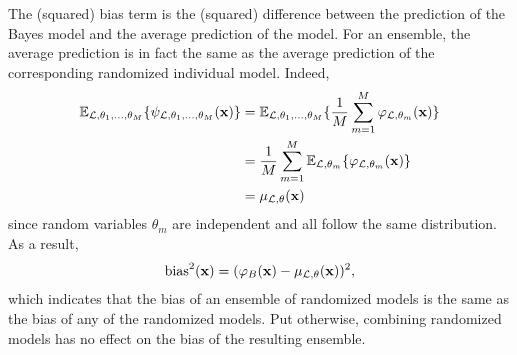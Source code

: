 The (squared) bias term is the (squared) difference between the prediction of the Bayes model
and the average prediction of the model. For an ensemble, the average prediction
is in fact the same as the average prediction of the corresponding randomized individual model. Indeed,
\begin{align}
\mathbb{E}_{{\cal L},\theta_1,\dots,\theta_M} \{ \psi_{{\cal L},\theta_1,\dots,\theta_M}(\mathbf{x}) \} &= \mathbb{E}_{{\cal L},\theta_1,\dots,\theta_M} \{ \frac{1}{M} \sum_{m=1}^M \varphi_{{\cal L},\theta_m}(\mathbf{x}) \} \nonumber \\
&= \frac{1}{M} \sum_{m=1}^M \mathbb{E}_{{\cal L},\theta_m} \{ \varphi_{{\cal L},\theta_m}(\mathbf{x}) \} \nonumber \\
&= \mu_{{\cal L},\theta}(\mathbf{x})
\end{align}
since random variables $\theta_m$ are independent and all follow the
same distribution. As a result,
\begin{equation}
\text{bias}^2(\mathbf{x}) = (\varphi_B(\mathbf{x}) - \mu_{{\cal L},\theta}(\mathbf{x}))^2,
\end{equation}
which indicates that the bias of an ensemble of randomized models is the same
as the bias of any of the randomized models. Put otherwise, combining
randomized models has no effect on the bias of the resulting ensemble.

